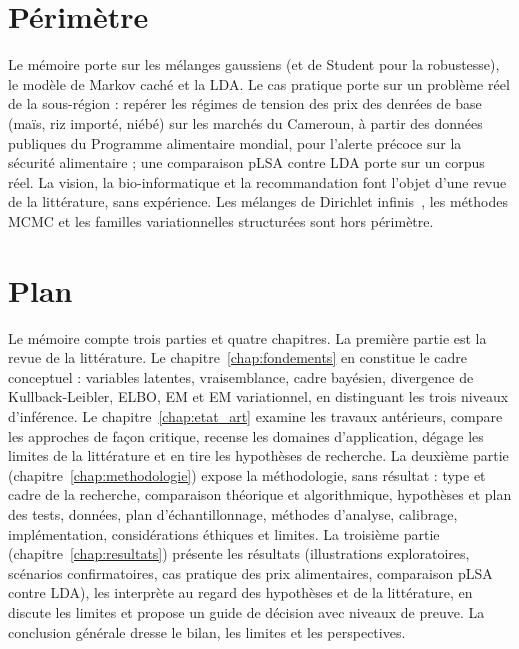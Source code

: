 \section*{Périmètre}
Le mémoire porte sur les mélanges gaussiens (et de Student pour la robustesse), le modèle de Markov caché et la LDA. Le cas pratique porte sur un problème réel de la sous-région : repérer les régimes de tension des prix des denrées de base (maïs, riz importé, niébé) sur les marchés du Cameroun, à partir des données publiques du Programme alimentaire mondial, pour l'alerte précoce sur la sécurité alimentaire ; une comparaison pLSA contre LDA porte sur un corpus réel. La vision, la bio-informatique et la recommandation font l'objet d'une revue de la littérature, sans expérience. Les mélanges de Dirichlet infinis~\cite{rasmussen2000,blei2006}, les méthodes MCMC et les familles variationnelles structurées sont hors périmètre.

\section*{Plan}
Le mémoire compte trois parties et quatre chapitres. La première partie est la revue de la littérature. Le chapitre~\ref{chap:fondements} en constitue le cadre conceptuel : variables latentes, vraisemblance, cadre bayésien, divergence de Kullback-Leibler, ELBO, EM et EM variationnel, en distinguant les trois niveaux d'inférence. Le chapitre~\ref{chap:etat_art} examine les travaux antérieurs, compare les approches de façon critique, recense les domaines d'application, dégage les limites de la littérature et en tire les hypothèses de recherche. La deuxième partie (chapitre~\ref{chap:methodologie}) expose la méthodologie, sans résultat : type et cadre de la recherche, comparaison théorique et algorithmique, hypothèses et plan des tests, données, plan d'échantillonnage, méthodes d'analyse, calibrage, implémentation, considérations éthiques et limites. La troisième partie (chapitre~\ref{chap:resultats}) présente les résultats (illustrations exploratoires, scénarios confirmatoires, cas pratique des prix alimentaires, comparaison pLSA contre LDA), les interprète au regard des hypothèses et de la littérature, en discute les limites et propose un guide de décision avec niveaux de preuve. La conclusion générale dresse le bilan, les limites et les perspectives.
